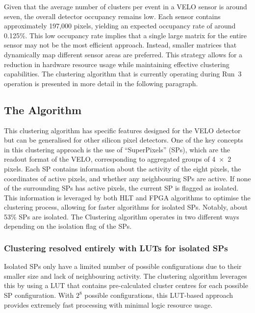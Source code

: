 Given that the average number of clusters per event in a VELO sensor is around seven, the overall detector occupancy remains low. Each sensor contains approximately 197,000 pixels, yielding an expected occupancy rate of around 0.125\%\cite{Bediaga:2013tje}. This low occupancy rate implies that a single large matrix for the entire sensor may not be the most efficient approach. Instead, smaller matrices that dynamically map different sensor areas are preferred. This strategy allows for a reduction in hardware resource usage while maintaining effective clustering capabilities. 
The clustering algorithm that is currently operating during Run~3 operation is presented in more detail in the following paragraph.

\subsection*{The Algorithm}
This clustering algorithm has specific features designed for the VELO detector but can be generalised for other silicon pixel detectors. One of the key concepts in this clustering approach is the use of ``SuperPixels'' (SPs), which are the readout format of the VELO, corresponding to aggregated groups of 4~×~2 pixels. Each SP contains information about the activity of the eight pixels, the coordinates of active pixels, and whether any neighbouring SPs are active. If none of the surrounding SPs has active pixels, the current SP is flagged as isolated. This information is leveraged by both HLT and FPGA algorithms to optimise the clustering process, allowing for faster algorithms for isolated SPs. Notably, about 53\% SPs are isolated.
The Clustering algorithm operates in two different ways depending on the isolation flag of the SPs.
\subsubsection{Clustering resolved entirely with LUTs for isolated SPs}
Isolated SPs only have a limited number of possible configurations due to their smaller size and lack of neighbouring activity. The clustering algorithm leverages this by using a LUT that contains pre-calculated cluster centres for each possible SP configuration. With $2^8$ possible configurations, this LUT-based approach provides extremely fast processing with minimal logic resource usage.

